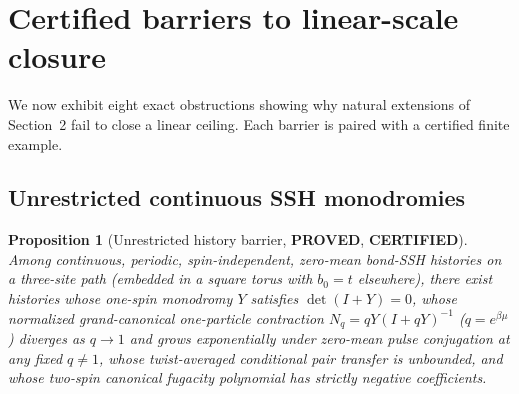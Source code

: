 \documentclass[11pt]{article}
\newtheorem{proposition}{Proposition}
\theoremstyle{remark}
\newcommand{\proved}{\textbf{PROVED}}
\newcommand{\certified}{\textbf{CERTIFIED}}
\begin{document}
\section{Certified barriers to linear-scale closure}

We now exhibit eight exact obstructions showing why natural extensions of Section~2 fail to close a linear ceiling. Each barrier is paired with a certified finite example.

\subsection{Unrestricted continuous SSH monodromies}

\begin{proposition}[Unrestricted history barrier, \proved, \certified]\label{prop:unrestricted}
Among continuous, periodic, spin-independent, zero-mean bond-SSH histories on a three-site path (embedded in a square torus with $b_0=t$ elsewhere), there exist histories whose one-spin monodromy $Y$ satisfies $\det(I+Y)=0$, whose normalized grand-canonical one-particle contraction $N_q=qY(I+qY)^{-1}$ ($q=e^{\beta\mu}$) diverges as $q\to 1$ and grows exponentially under zero-mean pulse conjugation at any fixed $q\ne 1$, whose twist-averaged conditional pair transfer is unbounded, and whose two-spin canonical fugacity polynomial has strictly negative coefficients.
\end{proposition}
\end{document}
